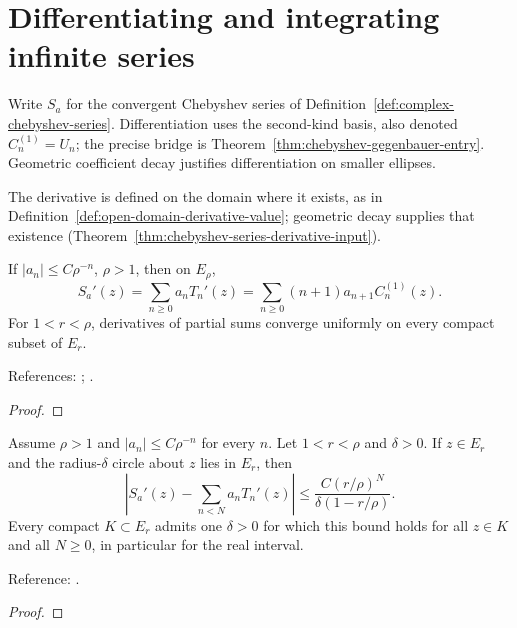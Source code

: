 \section{Differentiating and integrating infinite series}\label{sec:textbook-calculus-differentiation}

Write $S_a$ for the convergent Chebyshev series of Definition~\ref{def:complex-chebyshev-series}. Differentiation uses the second-kind basis, also denoted $C_n^{(1)}=U_n$; the precise bridge is Theorem~\ref{thm:chebyshev-gegenbauer-entry}. Geometric coefficient decay justifies differentiation on smaller ellipses.

The derivative is defined on the domain where it exists, as in Definition~\ref{def:open-domain-derivative-value}; geometric decay supplies that existence (Theorem~\ref{thm:chebyshev-series-derivative-input}).

\begin{theorem}
\label{thm:chebyshev-series-differentiation}
\leanok
If $|a_n|\le C\rho^{-n}$, $\rho>1$, then on $E_\rho$,
\[
 S_a'(z)=\sum_{n\ge0}a_nT_n'(z)
        =\sum_{n\ge0}(n+1)a_{n+1}C_n^{(1)}(z).
\]
For $1<r<\rho$, derivatives of partial sums converge uniformly on every
compact subset of $E_r$.

References: \cite[Chapter 21]{atap}; \cite[18.9.21]{dlmf}.
\end{theorem}
\begin{proof}
\leanok
\end{proof}

\begin{theorem}
\label{thm:chebyshev-series-derivative-error}
\leanok
Assume $\rho>1$ and $|a_n|\le C\rho^{-n}$ for every $n$. Let $1<r<\rho$ and $\delta>0$. If $z\in E_r$ and the
radius-$\delta$ circle about $z$ lies in $E_r$, then
\[
 \left|S_a'(z)-\sum_{n<N}a_nT_n'(z)\right|
 \le \frac{C(r/\rho)^N}{\delta(1-r/\rho)}.
\]
Every compact $K\subset E_r$ admits one $\delta>0$ for which this bound holds
for all $z\in K$ and all $N\ge0$, in particular for the real interval.

Reference: \cite[Theorem 21.1]{atap}.
\end{theorem}
\begin{proof}
\leanok
\end{proof}


